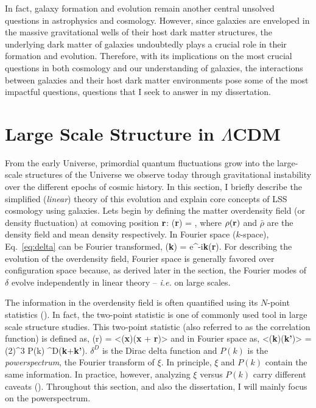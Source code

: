 In fact, galaxy formation and evolution remain another central unsolved questions in
astrophysics and cosmology. However, since galaxies are enveloped in the massive gravitational
wells of their host dark matter structures, the underlying dark matter of galaxies undoubtedly
plays a crucial role in their formation and evolution. Therefore, with its implications on the most
crucial questions in both cosmology and our understanding of galaxies, the interactions between
galaxies and their host dark matter environments pose some of the most impactful questions,
questions that I seek to answer in my dissertation. 


\section{Large Scale Structure in $\Lambda$CDM} \label{sec:lss}
From the early Universe, primordial quantum fluctuations grow into the 
large-scale structures of the Universe we observe today through gravitational 
instability over the different epochs of cosmic history. In this section, I briefly 
describe the simplified ({\em linear}) theory of this evolution and explain core 
concepts of LSS cosmology using galaxies. Lets begin by defining the matter 
overdensity field (or density fluctuation) at comoving position ${\bf r}$: 
\beq \label{eq:delta}
\delta({\bf r}) = , 
\eeq
where $\rho({\bf r})$ and $\bar{\rho}$ are the density field and mean 
density respectively. In Fourier space ($k$-space), Eq.~\ref{eq:delta} can 
be Fourier transformed, 
\beq
\delta({\bf k}) = \int {} e^{-i{\bf k}}\;\delta({\bf r}).
\eeq
For describing the evolution of the overdensity field, Fourier space is generally 
favored over configuration space because, as derived later in the section,
the Fourier modes of $\delta$ evolve independently in linear theory -- 
\emph{i.e.} on large scales.

The information in the overdensity field is often quantified using its 
$N$-point statistics (). In fact, the two-point
statistic is one of commonly used tool in large scale structure studies.
This two-point statistic (also referred to as the correlation function) is
defined as, 
\beq
\xi(r) = <\delta({\bf x})\delta({\bf x} +  {\bf r})>
\eeq
and in Fourier space as,
\beq
<\delta({\bf k})\delta({\bf k'})> = (2\pi)^3 P(k) \delta^{D}({\bf k}+{\bf k'}).
\eeq
$\delta^{D}$ is the Dirac delta function and $P(k)$ is the {\em powerspectrum}, 
the Fourier transform of $\xi$. In principle, $\xi$ and $P(k)$ contain the same 
information. In practice, however, analyzing $\xi$ versus $P(k)$ carry different 
caveats (). Throughout this section, and also the dissertation, 
I will mainly focus on the powerspectrum. 

